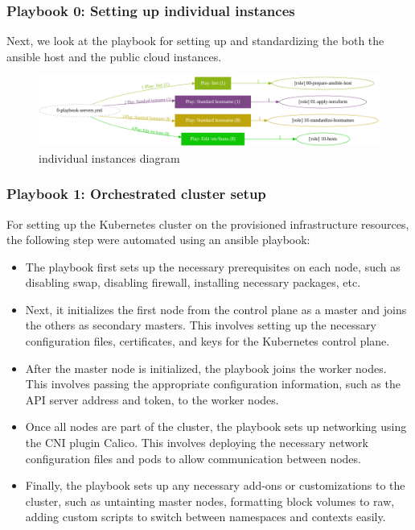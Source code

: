\subsubsection{Playbook 0: Setting up individual instances}

Next, we look at the playbook for setting up and standardizing the both the ansible host and the public cloud instances.

\begin{figure}[H]\centering
\includegraphics[width=1.0\textwidth,angle=00]{assets/f17.png}
\caption{individual instances diagram}
\label{fig:individual instances diagram}
\end{figure}

\subsubsection{Playbook 1: Orchestrated cluster setup}

For setting up the Kubernetes cluster on the provisioned infrastructure resources, the following step were automated using an ansible playbook:

\begin{itemize}[label={--}]
    \item The playbook first sets up the necessary prerequisites on each node, such as disabling swap, disabling firewall, installing necessary packages, etc.
    \item Next, it initializes the first node from the control plane as a master and joins the others as secondary masters. This involves setting up the necessary configuration files, certificates, and keys for the Kubernetes control plane.
    \item After the master node is initialized, the playbook joins the worker nodes. This involves passing the appropriate configuration information, such as the API server address and token, to the worker nodes.
    \item Once all nodes are part of the cluster, the playbook sets up networking using the CNI plugin Calico. This involves deploying the necessary network configuration files and pods to allow communication between nodes.
    \item Finally, the playbook sets up any necessary add-ons or customizations to the cluster, such as untainting master nodes, formatting block volumes to raw, adding custom scripts to switch between namespaces and contexts easily.
\end{itemize}

